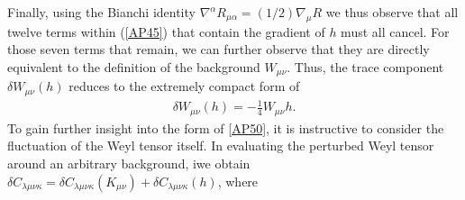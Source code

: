 %
Finally, using the Bianchi identity $\nabla^{\alpha}R_{\mu\alpha}=(1/2)\nabla _{\mu}R$ we thus observe that all twelve terms within (\ref{AP45}) that contain the gradient of $h$ must all cancel. For those seven terms that remain, we can further observe that they are directly equivalent to the definition of the background $W_{\mu\nu}$. Thus, the trace component $\delta W_{\mu\nu}(h)$ reduces to the extremely compact form of
%
\begin{eqnarray}
\delta W_{\mu\nu}(h)=-\frac{1}{4}W_{\mu\nu}h.
\label{AP50}
\end{eqnarray}
%
To gain further insight into the form of \eqref{AP50}, it is instructive to consider the fluctuation of the Weyl tensor itself. In evaluating the perturbed Weyl tensor around an arbitrary background, iwe obtain $\delta C_{\lambda\mu\nu\kappa}=\delta C_{\lambda\mu\nu\kappa}(K_{\mu\nu})+\delta C_{\lambda\mu\nu\kappa}(h)$, where
%
